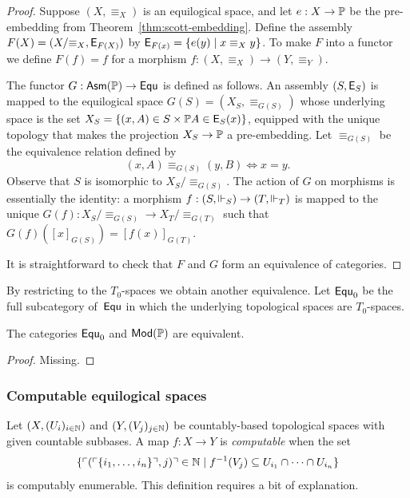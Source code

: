 \begin{proof}
  Suppose $(X, {\equiv_X})$ is an equilogical space, and let $e : X
  \to \mathbb{P}$ be the pre-embedding from
  Theorem~\ref{thm:scott-embedding}. Define the assembly $F(X) =
  (X/{\equiv_X}, \mathsf{E}_{F(X)})$ by $\mathsf{E}_{F(x)} = \{e(y) \mid x
    \equiv_X y\}$. To make $F$ into a functor we define $F(f) = f$ for
  a morphism $f : (X, {\equiv_X}) \to (Y, {\equiv_Y})$.

  The functor $G : \mathsf{Asm}(\mathbb{P}) \to \mathsf{Equ}$ is defined as follows. An
  assembly $(S, \mathsf{E}_S)$ is mapped to the equilogical space $G(S) =
  (X_S, \equiv_{G(S)})$ whose underlying space is the set $X_S =
  \{(x,A) \in S \times \mathbb{P} A \in \mathsf{E}_S(x)\}$, equipped with the
  unique topology that makes the projection $X_S \to \mathbb{P}$ a
  pre-embedding. Let $\equiv_{G(S)}$ be the equivalence relation
  defined by
  \begin{equation*}
    (x,A) \equiv_{G(S)} (y,B) \iff x = y.
  \end{equation*}
  Observe that $S$ is isomorphic to $X_S/{\equiv_{G(S)}}$. The action
  of $G$ on morphisms is essentially the identity: a morphism $f : (S,
  {\Vdash_S}) \to (T, {\Vdash_T})$ is mapped to the unique $G(f) :
  X_S/{\equiv_{G(S)}} \to X_T/{\equiv_{G(T)}}$ such that
  $G(f)([x]_{G(S)}) = [f(x)]_{G(T)}$.

  It is straightforward to check that $F$ and $G$ form an equivalence
  of categories.
\end{proof}

By restricting to the $T_0$-spaces we obtain another equivalence. Let
$\mathsf{Equ}_0$ be the full subcategory of~$\mathsf{Equ}$ in which the underlying
topological spaces are $T_0$-spaces.


\begin{proposition}
  The categories $\mathsf{Equ}_0$ and $\mathsf{Mod}(\mathbb{P})$ are equivalent.
\end{proposition}

\begin{proof}
  Missing.
\end{proof}

\subsubsection{Computable equilogical spaces}
\label{sec:computable-equ}

Let $(X, (U_i)_{i \in \mathbb{N}})$ and $(Y, (V_j)_{j \in \mathbb{N}})$ be
countably-based topological spaces with given countable subbases. A
map $f : X \to Y$ is \emph{computable} when the set
%
\begin{equation*}
  \{\ulcorner (\ulcorner \{i_1,\ldots,i_n\} \urcorner,j) \urcorner \in \mathbb{N} \mid 
      {f}^{-1}(V_j) \subseteq U_{i_1} \cap \cdots \cap U_{i_n}\}
\end{equation*}
%
is computably enumerable. This definition requires a bit of
explanation.


